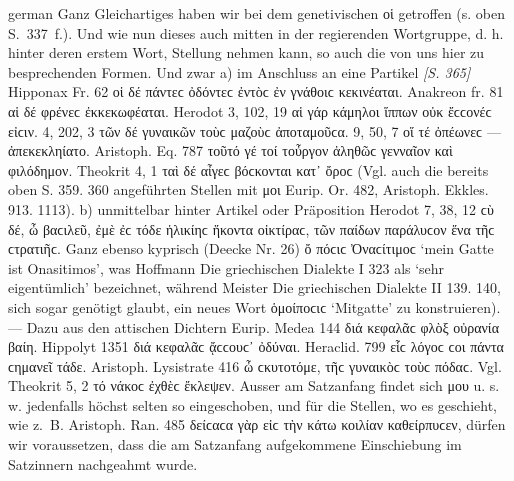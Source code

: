 \begin{otherlanguage*}{german}
Ganz Gleichartiges haben wir bei dem genetivischen οἱ getroffen (s. oben S.~337~f.). Und wie nun dieses auch mitten in der regierenden Wortgruppe, d. h. hinter deren erstem Wort, Stellung nehmen kann, so auch die von uns hier zu besprechenden Formen. Und zwar a) im Anschluss an eine Partikel \hypertarget{p365}{\emph{[S. 365]}}\label{p365} Hipponax Fr. 62 οἱ δέ  πάντεϲ ὀδόντεϲ ἐντὸϲ ἐν γνάθοιϲ κεκινέαται. Anakreon fr. 81 αἱ δέ  φρένεϲ ἐκκεκωφέαται. Herodot 3, 102, 19 αἱ γάρ  κάμηλοι ἵππων οὐκ ἔϲϲονέϲ εἰϲιν. 4, 202, 3 τῶν δέ  γυναικῶν τοὺϲ μαζοὺϲ ἀποταμοῦϲα. 9, 50, 7 οἵ τέ  ὀπέωνεϲ — ἀπεκεκληίατο. Aristoph. Eq. 787 τοῦτό γέ τοί  τοὖργον ἀληθῶϲ γενναῖον καὶ φιλόδημον. Theokrit 4, 1 ταὶ δέ  αἶγεϲ βόϲκονται κατ᾽ ὄροϲ (Vgl. auch die bereits oben S. 359. 360 angeführten Stellen mit μοι Eurip. Or. 482, Aristoph. Ekkles. 913. 1113). b) unmittelbar hinter Artikel oder Präposition Herodot 7, 38, 12 ϲὺ δέ, ὦ βαϲιλεῦ, ἐμὲ ἐϲ τόδε ἡλικίηϲ ἥκοντα οἰκτίραϲ, τῶν  παίδων παράλυϲον ἕνα τῆϲ ϲτρατιῆϲ. Ganz ebenso kyprisch (Deecke Nr. 26) ὄ  πόϲιϲ Ὀναϲίτιμοϲ ‘mein Gatte ist Onasitimos’, was Hoffmann Die griechischen Dialekte I 323 als ‘sehr eigentümlich’ bezeichnet, während Meister Die griechischen Dialekte II 139. 140, sich sogar genötigt glaubt, ein neues Wort ὁμοίποϲιϲ ‘Mitgatte’ zu konstruieren). — Dazu aus den attischen Dichtern Eurip. Medea 144 διά  κεφαλᾶϲ φλὸξ οὐρανία βαίη. Hippolyt 1351 διά  κεφαλᾶϲ ᾄϲϲουϲ᾽ ὀδύναι. Heraclid. 799 εἷϲ  λόγοϲ ϲοι πάντα ϲημανεῖ τάδε. Aristoph. Lysistrate 416 ὦ ϲκυτοτόμε, τῆϲ  γυναικὸϲ τοὺϲ πόδαϲ. Vgl. Theokrit 5, 2 τό  νάκοϲ ἐχθὲϲ ἔκλεψεν. Ausser am Satzanfang findet sich μου u. s. w. jedenfalls höchst selten so eingeschoben, und für die Stellen, wo es geschieht, wie z.~B. Aristoph. Ran. 485 δείϲαϲα γὰρ εἰϲ τὴν κάτω  κοιλίαν καθείρπυϲεν, dürfen wir voraussetzen, dass die am Satzanfang aufgekommene Einschiebung im Satzinnern nachgeahmt wurde.


\end{otherlanguage*}
